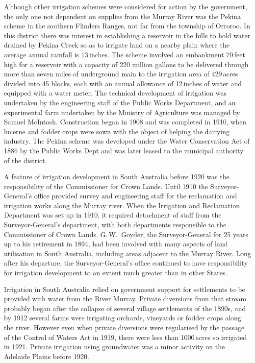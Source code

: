Although other irrigation schemes were considered for action by the
government, the only one not dependent on supplies from the Murray
River was the Pekina scheme  in the
southern Flinders Ranges,  not far from the
township of Orroroo.  In this district there was
interest in establishing a reservoir in the hills to hold water
drained by Pekina Creek  so as to irrigate land on
a nearby plain where the average annual rainfall is 13\,inches.  The
scheme involved an embankment 70\,feet high for a reservoir with a
capacity of 220 million gallons to be delivered through more than
seven miles of underground main to the irrigation area of 429\,acres
divided into 45 blocks, each with an annual allowance of 12\,inches of
water and equipped with a water meter.  The technical development of
irrigation was undertaken by the engineering staff of the Public Works
Department, and an experimental farm undertaken by the Ministry of
Agriculture was managed by Samuel McIntosh.  Construction began in
1908 and was completed in 1910, when lucerne and fodder crops were
sown with the object of helping the dairying industry.  The Pekina
scheme was developed under the Water Conservation Act of 1886
 by the
Public Works Dept and was later leased to the municipal authority of
the district.

A feature of irrigation development in South Australia before 1920 was
the responsibility of the Commissioner for Crown Lands.  Until 1910
the Surveyor-General's office provided survey and engineering staff
for the reclamation and irrigation works along the Murray river.  When
the Irrigation and Reclamation Department was set up in 1910, it
required detachment of staff from the Surveyor-General's department,
with both departments responsible to the Commissioner of Crown Lands.
G.\,W.~Goyder,  the Surveyor-General for 25
years up to his retirement in 1894, had been involved with many
aspects of land utilisation in South Australia, including areas
adjacent to the Murray River.  Long after his departure, the
Surveyor-General's office continued to have responsibility for
irrigation development to an extent much greater than in other States.

Irrigation in South Australia relied on government support for
settlements to be provided with water from the River Murray.  Private
diversions from that stream probably began after the collapse of
several village settlements of the 1890s, and by 1912 several farms
were irrigating orchards, vineyards or fodder crops along the river.
However even when private diversions were regularised by the passage
of the Control of Waters Act in 1919,  there were less than 1000\,acres so irrigated in
1921. Private irrigation using groundwater was a minor activity on the
Adelaide Plains before 1920.

